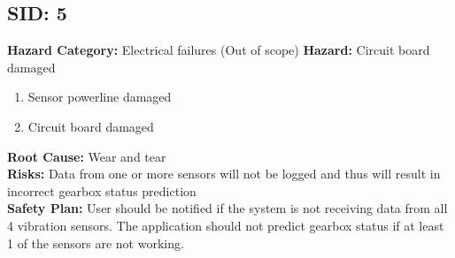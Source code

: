 \subsection{SID: 5}		
\textbf{Hazard Category:} Electrical failures (Out of scope)
\textbf{Hazard:} Circuit board damaged
\begin{enumerate}
	\item Sensor powerline damaged
	\item Circuit board damaged
\end{enumerate}
\textbf{Root Cause:}
Wear and tear \\
\textbf{Risks:} Data from one or more sensors will not be logged and thus will result in incorrect gearbox status prediction\\
\textbf{Safety Plan:}
User should be notified if the system is not receiving data from all 4 vibration sensors. The application should not predict gearbox status if at least 1 of the sensors are not working.